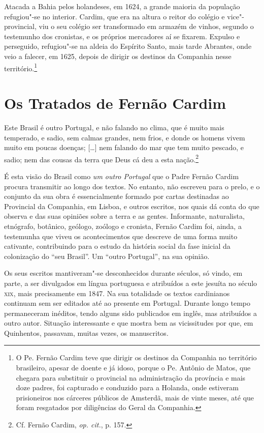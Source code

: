 Atacada a Bahia pelos holandeses, em 1624, a grande maioria da
população refugiou"-se no interior. Cardim, que era na altura o reitor
do colégio e vice"-provincial, viu o seu colégio ser transformado em
armazém de vinhos, segundo o testemunho dos cronistas, e os próprios
mercadores aí se fixarem. Expulso e perseguido, refugiou"-se na aldeia
do Espírito Santo, mais tarde Abrantes, onde veio a falecer, em 1625,
depois de dirigir os destinos da Companhia nesse território.\footnote{ O Pe. 
Fernão Cardim teve que dirigir os destinos da Companhia no
território brasileiro, apesar de doente e já idoso, porque o Pe. Antônio 
de Matos, que chegara para substituir o provincial na
administração da província e mais doze padres, foi capturado e
conduzido para a Holanda, onde estiveram prisioneiros nos cárceres
públicos de Amsterdã, mais de vinte meses, até que foram resgatados
por diligências do Geral da Companhia.} 

\section{Os Tratados de Fernão Cardim}

\begin{hedraquote}
Este Brasil é outro Portugal, e não falando no clima,
que é muito mais temperado, e sadio, sem calmas grandes, nem frios, e
donde os homens vivem muito em poucas doenças; [\ldots{}] nem falando do mar
que tem muito pescado, e sadio; nem das cousas da terra que Deus cá deu
a esta nação.\footnote{ Cf. Fernão Cardim, \textit{op. cit.}, p. 157.}
\end{hedraquote}

É esta visão do Brasil como \textit{um outro Portugal} que o Padre
Fernão Cardim procura transmitir ao longo dos textos. No entanto, não
escreveu para o prelo, e o conjunto da sua obra é essencialmente formado
por cartas destinadas ao Provincial da Companhia, em Lisboa, e outros
escritos, nos quais dá conta do que observa e das suas opiniões sobre a
terra e as gentes. Informante, naturalista, etnógrafo, botânico,
geólogo, zoólogo e cronista, Fernão Cardim foi, ainda, a testemunha que
viveu os acontecimentos que descreve de uma forma muito cativante,
contribuindo para o estudo da história social da fase inicial da
colonização do ``seu Brasil''. Um ``outro Portugal'', na sua opinião.

Os seus escritos mantiveram"-se desconhecidos durante séculos, só
vindo, em parte, a ser divulgados em língua portuguesa e atribuídos a
este jesuíta no século \textsc{xix}, mais precisamente em 1847. Na sua
totalidade os textos cardinianos continuam sem ser editados até ao
presente em Portugal. Durante longo tempo permaneceram inéditos, tendo
alguns sido publicados em inglês, mas atribuídos a outro autor.
Situação interessante e que mostra bem as vicissitudes por que, em
Quinhentos, passavam, muitas vezes, os manuscritos.

